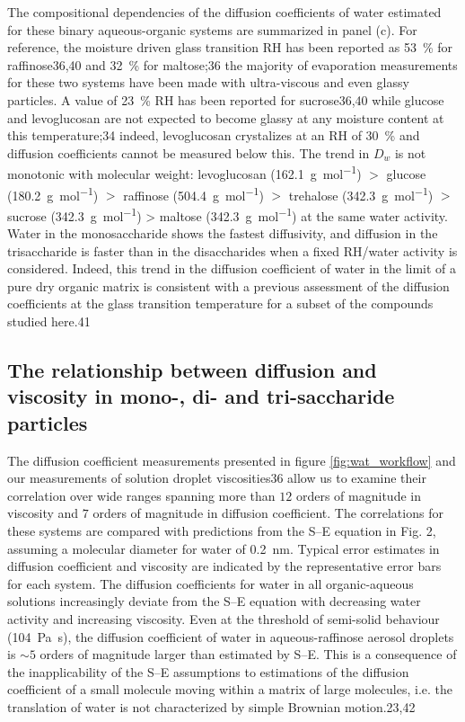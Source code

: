 The compositional dependencies of the diffusion coefficients of water estimated for these binary aqueous-organic systems are summarized in panel (c). For reference, the moisture driven glass transition RH has been reported as \SI{53}{\percent} for raffinose36,40 and \SI{32}{\percent} for maltose;36 the majority of evaporation measurements for these two systems have been made with ultra-viscous and even glassy particles. A value of \SI{23}{\percent} RH has been reported for sucrose36,40 while glucose and levoglucosan are not expected to become glassy at any moisture content at this temperature;34 indeed, levoglucosan crystalizes at an RH of \SI{30}{\percent} and diffusion coefficients cannot be measured below this. The trend in $D_{w}$ is not monotonic with molecular weight: levoglucosan (\SI{162.1}{\gram\per\mol}) $>$ glucose (\SI{180.2}{\gram\per\mol}) $>$ raffinose (\SI{504.4}{\gram\per\mole}) $>$ trehalose (\SI{342.3}{\gram\per\mole}) $>$ sucrose (\SI{342.3}{\gram\per\mol}) > maltose (\SI{342.3}{\gram\per\mole}) at the same water activity. Water in the monosaccharide shows the fastest diffusivity, and diffusion in the trisaccharide is faster than in the disaccharides when a fixed RH/water activity is considered. Indeed, this trend in the diffusion coefficient of water in the limit of a pure dry organic matrix is consistent with a previous assessment of the diffusion coefficients at the glass transition temperature for a subset of the compounds studied here.41

\subsection{The relationship between diffusion and viscosity in mono-, di- and tri-saccharide particles}

The diffusion coefficient measurements presented in figure \ref{fig:wat_workflow} and our measurements of solution droplet viscosities36 allow us to examine their correlation over wide ranges spanning more than $12$ orders of magnitude in viscosity and $7$ orders of magnitude in diffusion coefficient. The correlations for these systems are compared with predictions from the S–E equation in Fig. 2, assuming a molecular diameter for water of \SI{0.2}{\nano\meter}. Typical error estimates in diffusion coefficient and viscosity are indicated by the representative error bars for each system. The diffusion coefficients for water in all organic-aqueous solutions increasingly deviate from the S–E equation with decreasing water activity and increasing viscosity. Even at the threshold of semi-solid behaviour (\SI{104}{\pascal\second}), the diffusion coefficient of water in aqueous-raffinose aerosol droplets is $\sim 5$ orders of magnitude larger than estimated by S–E. This is a consequence of the inapplicability of the S–E assumptions to estimations of the diffusion coefficient of a small molecule moving within a matrix of large molecules, i.e. the translation of water is not characterized by simple Brownian motion.23,42


